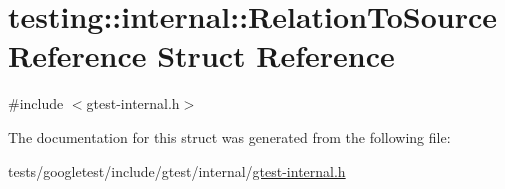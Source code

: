 \hypertarget{structtesting_1_1internal_1_1RelationToSourceReference}{}\section{testing\+:\+:internal\+:\+:Relation\+To\+Source\+Reference Struct Reference}
\label{structtesting_1_1internal_1_1RelationToSourceReference}


{\ttfamily \#include $<$gtest-\/internal.\+h$>$}



The documentation for this struct was generated from the following file\+:\begin{DoxyCompactItemize}
\item 
tests/googletest/include/gtest/internal/\hyperlink{gtest-internal_8h}{gtest-\/internal.\+h}\end{DoxyCompactItemize}
